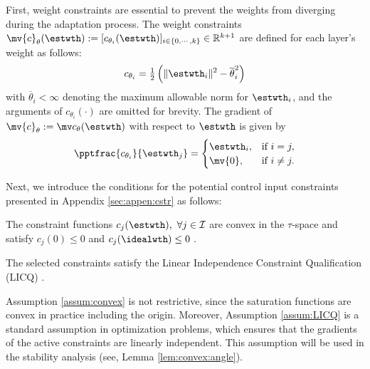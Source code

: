 \documentclass[lettersize,journal]{IEEEtran}
\begin{document}
First, weight constraints are essential to prevent the weights from diverging during the adaptation process.
The weight constraints $\mv{c}_{\theta}(\estwth):= [c_{\theta_i}(\estwth)]_{i\in\{0,\cdots ,k\}}\in\mathbb R^{k+1}$ are defined for each layer's weight as follows:
\begin{equation}
    c_{\theta_i}
    =
    \tfrac{1}{2}
    \left(
        \Vert \estwth_i\Vert^2 
        -
        \overline\theta_i^2 
    \right)    
    \label{eq:cstr:weight:ball}
\end{equation}
with $\overline\theta_i<\infty$ denoting the maximum allowable norm for $\estwth_i$, and the arguments of $c_{\theta_i}(\cdot)$ are omitted for brevity.
The gradient of $\mv{c}_\theta:=\mv c_{\theta}(\estwth)$ with respect to $\estwth$ is given by
\begin{equation}
    \pptfrac{c_{\theta_i}}{\estwth_j} 
    =
    \begin{cases}
        \estwth_i,
        &
        \text{if } i=j,
        \\
        \mv{0},
        &
        \text{if } i\ne j
        .
    \end{cases} 
    \label{eq:cstr:weight:ball:grad}
\end{equation}

Next, we introduce the conditions for the potential control input constraints presented in Appendix \ref{sec:appen:cstr} as follows:

\begin{assum}
    The constraint functions $c_j(\estwth),\ \forall j\in\mathcal I$ are convex in the $\tau$-space and satisfy $c_j(0) \le 0$ \color{red} and $c_j(\idealwth)\le 0$ \color{black}. 
    \label{assum:convex}
\end{assum}

\begin{assum}
    The selected constraints satisfy the Linear Independence Constraint Qualification (LICQ) \cite[Chap.~12 Def.~12.1]{Nocedal:2006aa}.
    \label{assum:LICQ}
\end{assum}

\begin{remark}
    Assumption \ref{assum:convex} is not restrictive, since the saturation functions are convex in practice including the origin.
    Moreover, Assumption \ref{assum:LICQ} is a standard assumption in optimization problems, which ensures that the gradients of the active constraints are linearly independent.
    This assumption will be used in the stability analysis (see, Lemma \ref{lem:convex:angle}).
\end{remark}
\end{document}
